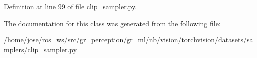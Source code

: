 Definition at line 99 of file clip\+\_\+sampler.\+py.



The documentation for this class was generated from the following file\+:\begin{DoxyCompactItemize}
\item 
/home/jose/ros\+\_\+ws/src/gr\+\_\+perception/gr\+\_\+ml/nb/vision/torchvision/datasets/samplers/clip\+\_\+sampler.\+py\end{DoxyCompactItemize}
